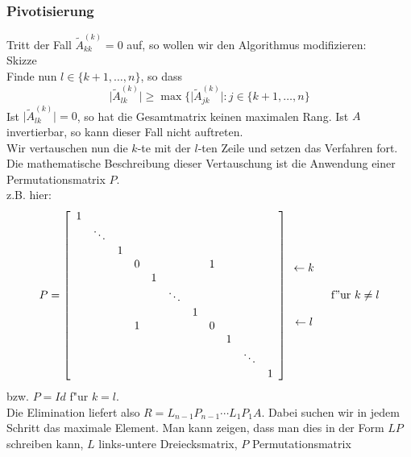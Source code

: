 \documentclass{scrartcl}
\begin{document}
\subsubsection{Pivotisierung}
Tritt der Fall $\tilde A_{kk}^{(k)} = 0$ auf, so wollen wir den Algorithmus modifizieren: \\
Skizze \\
Finde nun $l \in \{ k+1, \ldots, n \}$, so dass 
$$\vert \tilde A_{lk}^{(k)} \vert \geq \max \{ \vert \tilde A_{jk}^{(k)} \vert: j \in \{ k+1, \ldots, n \}$$
 Ist $\vert \tilde A_{lk}^{(k)} \vert = 0$, so hat die Gesamtmatrix keinen maximalen Rang. Ist $A$ invertierbar, so kann dieser Fall nicht auftreten. \\
Wir vertauschen nun die $k$-te mit der $l$-ten Zeile und setzen das Verfahren fort. \\
Die mathematische Beschreibung dieser Vertauschung ist die Anwendung einer Permutationsmatrix $P$. \\
z.B. hier: 
$$ P = 
\left[
\begin{array}{c c c c c c c c c c c c}
1 \\
& \ddots \\
& & 1 \\
& & & 0 & & & & 1 \\
& & & & 1 \\
& & & & & \ddots \\
& & & & & & 1 \\
& & & 1 & & & & 0 \\
& & & & & & & & 1 \\
& & & & & & & & & \ddots \\
& & & & & & & & & & 1
\end{array}
\right]
\begin{array}{c}
\\ \\ \\ \leftarrow k \\ \\ \\ \\ \leftarrow l \\ \\ \\ \\
\end{array}
 \quad \mathrm{f"ur \ } k \neq l
$$
bzw. $P = Id$ f"ur $k=l$. \\
Die Elimination liefert also $R = L_{n-1} P_{n-1} \cdots L_1 P_1 A$. Dabei suchen wir in jedem Schritt das maximale Element. Man kann zeigen, dass man dies in der Form $LP$ schreiben kann, $L$ links-untere Dreiecksmatrix, $P$ Permutationsmatrix
\end{document}
